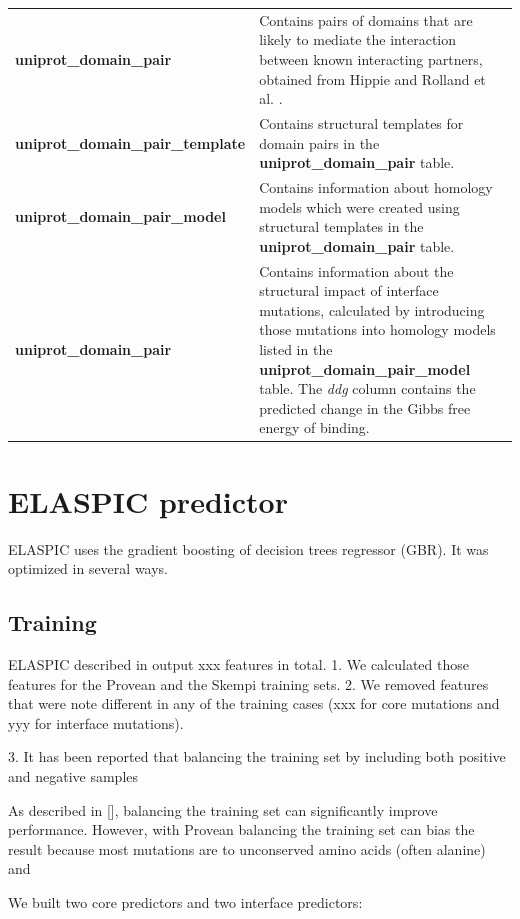 \begin{table}[ht]
\begin{tabular}{l | p{10cm}}
	\textbf{uniprot\_domain\_pair} & Contains pairs of domains that are likely to mediate the interaction between known interacting partners, obtained from Hippie \cite{schaefer_hippie:_2012} and Rolland et al. \cite{rolland_proteome-scale_2014}. \\
	\textbf{uniprot\_domain\_pair\_template} & Contains structural templates for domain pairs in the \textbf{uniprot\_domain\_pair} table. \\
	\textbf{uniprot\_domain\_pair\_model} & Contains information about homology models which were created using structural templates in the \textbf{uniprot\_domain\_pair} table. \\
	\textbf{uniprot\_domain\_pair} & Contains information about the structural impact of interface mutations, calculated by introducing those mutations into homology models listed in the \textbf{uniprot\_domain\_pair\_model} table. The \textit{ddg} column contains the predicted change in the Gibbs free energy of binding. \\
	\bottomrule
\end{tabular}
\end{table}


\section{ELASPIC predictor}

ELASPIC uses the gradient boosting of decision trees regressor (GBR). It was optimized in several ways.
\subsection{Training}

ELASPIC described in  output xxx features in total.
1. We calculated those features for the Provean and the Skempi training sets.
2. We removed features that were note different in any of the training cases (xxx for core mutations and yyy for interface mutations).

3. It has been reported that balancing the training set by including both positive and negative samples


As described in [], balancing the training set can significantly improve performance. However, with Provean balancing the training set can bias the result because most mutations are to unconserved amino acids (often alanine) and



We built two core predictors and two interface predictors:

